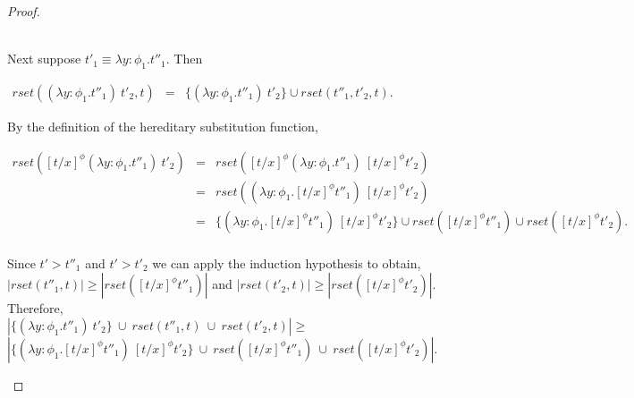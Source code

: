 \begin{proof}
\begin{itemize}
  \ \\
  Next suppose $t'_1 \equiv \lambda y:\phi_1.t''_1$.  Then 
  \begin{center}
    \begin{math}
      \begin{array}{lll}
        rset((\lambda y:\phi_1.t''_1)\ t'_2, t) & = & \{ (\lambda y:\phi_1.t''_1)\ t'_2\} \cup rset(t''_1, t'_2, t).
      \end{array}
    \end{math}
  \end{center}
  By the definition of the hereditary substitution function,
  \begin{center}
    \begin{math}
      \begin{array}{lll}
        rset([t/x]^\phi (\lambda y:\phi_1.t''_1)\ t'_2) & = & rset([t/x]^\phi (\lambda y:\phi_1.t''_1)\ [t/x]^\phi t'_2)\\
        & = & rset((\lambda y:\phi_1.[t/x]^\phi t''_1)\ [t/x]^\phi t'_2)\\
        & = & \{(\lambda y:\phi_1.[t/x]^\phi t''_1)\ [t/x]^\phi t'_2\} \cup 
        rset([t/x]^\phi t''_1) \cup rset([t/x]^\phi t'_2).\\
      \end{array}
    \end{math}
  \end{center}
  Since $t' > t''_1$ and $t' > t'_2$ we can apply the induction hypothesis to obtain,
  $|rset(t''_1, t)| \geq |rset([t/x]^\phi t''_1)|$ and $|rset(t'_2,t)| \geq |rset([t/x]^\phi t'_2)|$.  Therefore, \\
  $|\{ (\lambda y:\phi_1.t''_1)\ t'_2\}\ \cup\ rset(t''_1,t)\ \cup\ rset(t'_2,t)| \geq $ 
  $|\{(\lambda y:\phi_1.[t/x]^\phi t''_1)\ [t/x]^\phi t'_2\}\ \cup\ rset([t/x]^\phi t''_1)\ \cup\ rset([t/x]^\phi t'_2)|$.


\end{itemize}
\end{proof}

